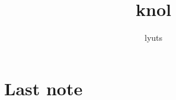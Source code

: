 \documentclass{book}
\begin{document}
\frontmatter

\author{lyuts}
\title{knol}

\maketitle

\newpage
\tableofcontents
\newpage



\mainmatter




\appendix


\backmatter
\chapter{Last note}
\end{document}
